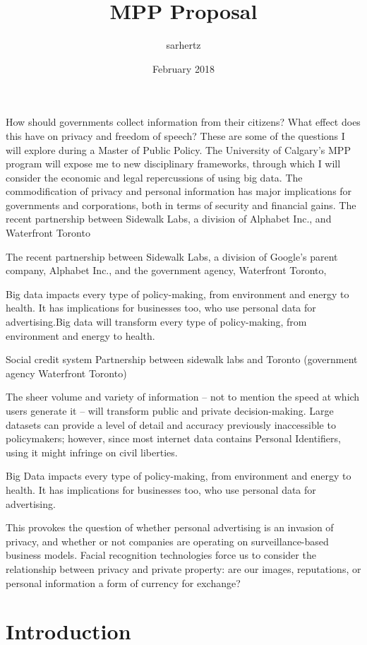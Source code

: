 \documentclass{article}
\title{MPP Proposal}
\author{sarhertz }
\date{February 2018}
\begin{document}
How should governments collect information from their citizens? What effect does this have on privacy and freedom of speech? These are some of the questions I will explore during a Master of Public Policy. The University of Calgary's MPP program will expose me to new disciplinary frameworks, through which I will consider the economic and legal repercussions of using big data. The commodification of privacy and personal information has major implications for governments and corporations, both in terms of security and financial gains. The recent partnership between Sidewalk Labs, a division of Alphabet Inc., and Waterfront Toronto 

The recent partnership between Sidewalk Labs, a division of Google’s parent company, Alphabet Inc., and the government agency, Waterfront Toronto, 

Big data impacts every type of policy-making, from environment and energy to health. It has implications for businesses too, who use personal data for advertising.Big data will transform every type of policy-making, from environment and energy to health. 

Social credit system
Partnership between sidewalk labs and Toronto (government agency Waterfront Toronto)

 

The sheer volume and variety of information – not to mention the speed at which users generate it – will transform public and private decision-making. Large datasets can provide a level of detail and accuracy previously inaccessible to policymakers; however, since most internet data contains Personal Identifiers, using it might infringe on civil liberties. 

Big Data impacts every type of policy-making, from environment and energy to health. It has implications for businesses too, who use personal data for advertising. 

This provokes the question of whether personal advertising is an invasion of privacy, and whether or not companies are operating on surveillance-based business models. Facial recognition technologies force us to consider the relationship between privacy and private property: are our images, reputations, or personal information a form of currency for exchange? 



\maketitle

\section{Introduction}
\end{document}
